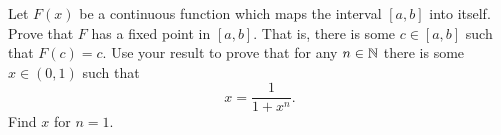 \begin{exercise}
  \label{ex:hw05:interval-fixed-point}
  Let $F(x)$ be a continuous function which maps the interval $[a,b]$
  into itself. Prove that $F$ has a fixed point in $[a,b]$. That is,
  there is some $c\in[a,b]$ such that $F(c)=c$. Use your result to
  prove that for any $n\in\mathbb{N}$ there is some $x\in(0,1)$ such that
  \[
    x=\frac{1}{1+x^n}.
  \]
  Find $x$ for $n=1$.
\end{exercise}
